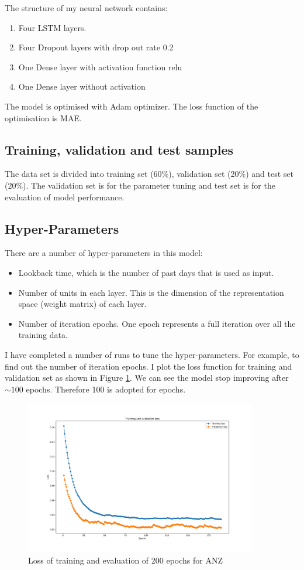 \documentclass[a4paper, 11pt, usenatbib]{article}
\begin{document}
The structure of my neural network contains:
\begin{enumerate}
\item Four LSTM layers.
\item Four Dropout layers with drop out rate 0.2
\item One Dense layer with activation function relu
\item One Dense layer without activation
\end{enumerate}

The model is optimised with Adam optimizer. The loss function of the optimisation is MAE.

\subsection{Training, validation and test samples}
The data set is divided into training set (60\%), validation set (20\%) and test set (20\%). The validation set is for the parameter tuning and test set is for the evaluation of model performance.


\subsection{Hyper-Parameters}
There are a number of hyper-parameters in this model:
\begin{itemize}

\item Lookback time, which is the number of past days that is used as input.
\item Number of units in each layer. This is the dimension of the representation space (weight matrix) of each layer.
\item Number of iteration epochs. One epoch represents a full iteration over all the training data.
\end{itemize}
I have completed a number of runs to tune the hyper-parameters.
For example, to find out the number of iteration epochs.
I plot the loss function for training and validation set as shown in Figure \ref{fig:regression_epochs}. We can see  the model stop improving after $\sim 100$ epochs. Therefore 100 is adopted for epochs.

\begin{figure}
	\centering
	\includegraphics[width=0.9\textwidth]{./figures/regression_epochs.pdf}
	\caption[]
	{Loss of training and evaluation of 200 epochs for ANZ}
		\label{fig:regression_epochs}
\end{figure}
\end{document}
